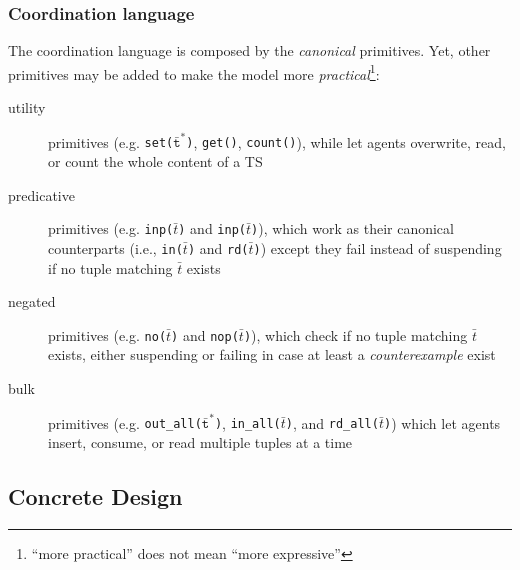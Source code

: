 \documentclass[presentation]{beamer}\mode<presentation>{\usetheme{AMSCesenaPurpleAndGold}}
\begin{document}
\begin{frame}%
	\frametitle{Coordination language}
	
	The \linda{} coordination language is composed by the \emph{canonical} primitives.
	Yet, other primitives may be added to make the model more \emph{practical}\footnote{``more practical'' does not mean ``more expressive''}:
	\vfill
	\begin{description}
		
		\item[utility] primitives (e.g. \alert{\texttt{set($\bar{\mathtt{t}}^*$)}}, \alert{\texttt{get()}}, \alert{\texttt{count()}}), while let agents overwrite, read, or count the whole content of a TS
		
		\vfill
		
		\item[predicative] primitives (e.g. \alert{\texttt{inp($\bar t$)}} and \alert{\texttt{inp($\bar t$)}}), which work as their canonical counterparts (i.e., \texttt{in($\bar t$)} and \texttt{rd($\bar t$)}) except they fail instead of suspending if no tuple matching $\bar t$ exists
		
		\vfill
		
		\item[negated] primitives (e.g. \alert{\texttt{no($\bar t$)}} and \alert{\texttt{nop($\bar t$)}}), which check if no tuple matching $\bar t$ exists, either suspending or failing in case at least a \emph{counterexample} exist
		
		\vfill
		
		\item[bulk] primitives (e.g. \alert{\texttt{out\_all($\bar{\mathtt{t}}^*$)}}, \alert{\texttt{in\_all($\bar t$)}}, and \alert{\texttt{rd\_all($\bar t$)}}) which let agents insert, consume, or read multiple tuples at a time
	\end{description}

	\vfill
	
\end{frame}

\subsection{Concrete Design}
	
\end{document}
